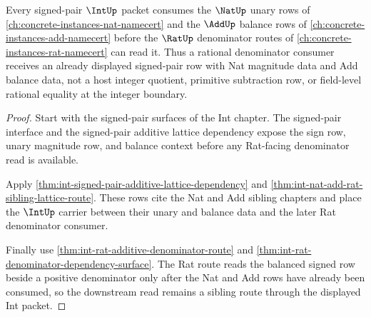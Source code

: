 \begin{theorem}
\label{thm:int-add-nat-sibling-route}
Every signed-pair $\IntUp$ packet consumes the $\NatUp$ unary rows of \autoref{ch:concrete-instances-nat-namecert} and the $\AddUp$ balance rows of \autoref{ch:concrete-instances-add-namecert} before the $\RatUp$ denominator routes of \autoref{ch:concrete-instances-rat-namecert} can read it. Thus a rational denominator consumer receives an already displayed signed-pair row with Nat magnitude data and Add balance data, not a host integer quotient, primitive subtraction row, or field-level rational equality at the integer boundary.
\end{theorem}
\begin{proof}
Start with the signed-pair surfaces of the Int chapter. The signed-pair interface and the signed-pair additive lattice dependency expose the sign row, unary magnitude row, and balance context before any Rat-facing denominator read is available.

Apply \autoref{thm:int-signed-pair-additive-lattice-dependency} and \autoref{thm:int-nat-add-rat-sibling-lattice-route}. These rows cite the Nat and Add sibling chapters and place the $\IntUp$ carrier between their unary and balance data and the later Rat denominator consumer.

Finally use \autoref{thm:int-rat-additive-denominator-route} and \autoref{thm:int-rat-denominator-dependency-surface}. The Rat route reads the balanced signed row beside a positive denominator only after the Nat and Add rows have already been consumed, so the downstream read remains a sibling route through the displayed Int packet.
\end{proof}
